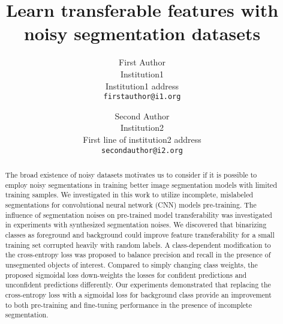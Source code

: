 \documentclass[10pt,twocolumn,letterpaper]{article}
\begin{document}
\onecolumn
{}


\twocolumn
{}
\newpage
\title{Learn transferable features with noisy segmentation datasets}

\author{First Author\\
Institution1\\
Institution1 address\\
{\tt\small firstauthor@i1.org}
\and
Second Author\\
Institution2\\
First line of institution2 address\\
{\tt\small secondauthor@i2.org}
}

\maketitle


\begin{abstract}


The broad existence of noisy datasets motivates us to consider if it is possible to employ noisy segmentations in training better image segmentation models with limited training samples.
We investigated in this work to utilize incomplete, mislabeled segmentations for convolutional neural network (CNN) models pre-training.
The influence of segmentation noises on pre-trained model transferability was investigated in experiments with synthesized segmentation noises.
We discovered that binarizing classes as foreground and background could improve feature transferability for a small training set corrupted heavily with random labels.
A class-dependent modification to the cross-entropy loss was proposed to balance precision and recall in the presence of unsegmented objects of interest.
Compared to simply changing class weights, the proposed sigmoidal loss down-weights the losses for confident predictions and unconfident predictions differently.
Our experiments demonstrated that replacing the cross-entropy loss with a sigmoidal loss for background class provide an improvement to both pre-training and fine-tuning performance in the presence of incomplete segmentation.

\end{abstract}

















{\small


}

\clearpage

\end{document}
